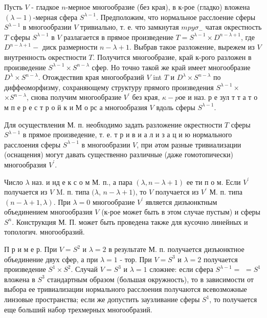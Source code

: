 \documentclass[10pt]{article}
\begin{document}
Пусть $V$ - гладкое $n$-мерное многообразие (без края), в к-рое (гладко) вложена $(\lambda-1)$-мерная сфера $S^{\lambda-1}$. Предположим, что нормальное расслоение сферы $S^{\lambda-1}$ в многообразии $V$ тривиально, т. е. что замкнутая $m p y \sigma_{-}$ чатая окрестность $T$ сферы $S^{\lambda-1}$ в $V$ разлагается в прямое произведение $T=S^{\lambda-1} \times D^{n-\lambda+1}$, где $D^{n-\lambda+1}-$ диск размерности $n-\lambda+1$. Выбрав такое разложение, вырежем из $V$ внутренность окрестности $T$. Получится многообразие, край к-рого разложен в произведение $S^{\lambda-1} \times S^{n-\lambda}$ сфер. Но точно такой же край имеет многообразие $D^{\lambda} \times S^{n-\lambda}$. Отождествив края многообразий $V$ int $T$ и $D^{\lambda} \times S^{n-\lambda}$ по диффеоморфизму, сохраняющему структуру прямого произведения $S^{\lambda-1} \times$ $\times S^{n-\lambda}$, снова получим многообразие $V^{\prime}$ без края, $\kappa-p о е$ и наз. р е зул т т а т о м п е р е с т р о й к и М о рс а многообразия $V$ вдоль сферы $S^{\lambda-1}$.



Для осуществления М. п. необходимо задать разложение окрестности $T$ сферы $S^{\lambda-1}$ в прямое произведение, т. е. т р и в и а л и з а ц и ю нормального расслоения сферы $S^{\lambda-1}$ в многообразии $V$, при әтом разные тривиализации (оснащения) могут давать существенно различные (даже гомотопически) многообразия $V^{\prime}$.



Число $\lambda$ наз. и нд е к с о м М. п., а пара $(\lambda, n-\lambda+1)$ ее ти п о м. Если $V^{\prime}$ получается из $V$ M. п. типа $(\lambda$, $n-\lambda+1)$, то $V$ получается из $V^{\prime}$ М. п. типа $(n-\lambda+1, \lambda)$. При $\lambda=0$ многообразие $V^{\prime}$ является дизъюнктным объединением многообразия $V$ (к-рое может быть в этом случае пустым) и сферы $S^{n}$. Конструкция М. П. может быть проведена также для кусочно линейных и топологич. многообразий.



П р и м е р. При $V=S^{2}$ и $\lambda=2$ в результате М. п. получается дизъюнктное объединение двух сфер, а при $\lambda=1$ - тор. При $V=S^{3}$ и $\lambda=2$ получается произведение $S^{1} \times S^{2}$. Случай $V=S^{3}$ и $\lambda=1$ сложнее: если сфера $S^{\lambda-1}=$ $=S^{1}$ вложена в $S^{3}$ стандартным образом (большая окружность), то в зависимости от выбора ее тривиализации нормального расслоения получаются всевозможные линзовые пространства; если же допустить заузливание сферы $S^{1}$, то получается еще больший набор трехмерных многообразий.
\end{document}
